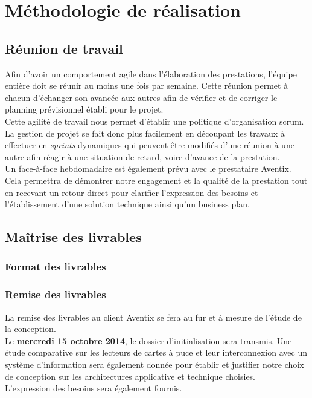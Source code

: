 \section{Méthodologie de réalisation}
\subsection{Réunion de travail}
Afin d'avoir un comportement agile dans l'élaboration des prestations, l'équipe
entière doit se réunir au moins une fois par semaine. Cette réunion permet à
chacun d'échanger son avancée aux autres afin de vérifier et de corriger le
planning prévisionnel établi pour le projet. \\

Cette agilité de travail nous permet d'établir une politique d'organisation
scrum. La gestion de projet se fait donc plus facilement en découpant les
travaux à effectuer en \textit{sprints} dynamiques qui peuvent être modifiés
d'une réunion à une autre afin réagir à une situation de retard, voire d'avance
de la prestation. \\

Un face-à-face hebdomadaire est également prévu avec le prestataire Aventix.
Cela permettra de démontrer notre engagement et la qualité de la prestation
tout en recevant un retour direct pour clarifier l'expression des besoins et
l'établissement d'une solution technique ainsi qu'un business plan. \\

\subsection{Maîtrise des livrables}
\subsubsection{Format des livrables}

\subsubsection{Remise des livrables}
La remise des livrables au client Aventix se fera au fur et à mesure de l'étude
de la conception. \\

Le \textbf{mercredi 15 octobre 2014}, le dossier d'initialisation sera transmis.
Une étude comparative sur les lecteurs de cartes à puce et leur interconnexion
avec un système d'information sera également donnée pour établir et justifier
notre choix de conception sur les architectures applicative et technique
choisies. \\
L'expression des besoins sera également fournis. \\

